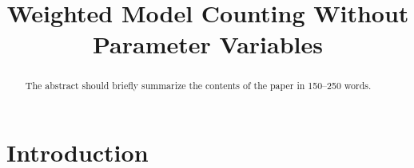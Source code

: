 \documentclass[runningheads]{llncs}
\begin{document}
\title{Weighted Model Counting Without Parameter Variables}





\maketitle              %

\begin{abstract}
  The abstract should briefly summarize the contents of the paper in
  150--250 words.

\end{abstract}

\section{Introduction}

\end{document}
